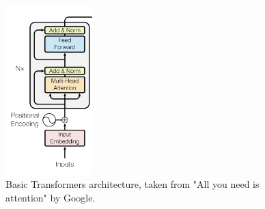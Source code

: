 \documentclass[11pt]{article}
\begin{document}
\begin{figure}[h]
\centering
\includegraphics[width=0.3\textwidth]{transformer-basic.png}
\caption{Basic Transformers architecture, taken from "All you need is attention" by Google. }
\label{fig:lorenz_attractor}
\end{figure}
\end{document}
